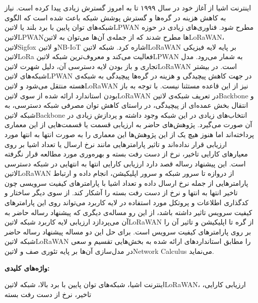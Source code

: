 \newpage\clearpage

\pagestyle{abstract}

\vspace*{-1cm}
\section*{\centering \abstractname}
\vspace*{.5cm}

اینترنت اشیا از آغاز خود در سال ۱۹۹۹ تا به امروز گسترش زیادی پیدا کرده است.
نیاز به کاهش هزینه در گره‌ها و گسترش پوشش شبکه باعث شده است که الگوی
شبکه‌های توان پایین با برد بلند یا
‌لاتین{LPWAN} مطرح شود.
فناوری‌های زیادی در حوزه ‌لاتین{LPWAN}ها مطرح شدند که از جمله‌ی آن‌ها می‌توان به ‌لاتین{LoRaWAN}، ‌لاتین{Sigfox} و ‌لاتین{NB-IoT}
اشاره کرد. شبکه ‌لاتین{LoRaWAN} بر پایه لایه فیزیکی ‌لاتین{LoRa} فعالیت می‌کند و
معروف‌ترین شبکه ‌لاتین{LPWAN} به شمار می‌رود. مدل تجاری و باز بودن
لایه دسترسی آن، دلیل شهرت ‌لاتین{LoRaWAN} است.
در بیشتر شبکه‌های ‌لاتین{LPWAN} در جهت کاهش پیچیدگی و هزینه در گره‌ها پیچیدگی به شبکه‌ی هسته منتقل می‌شود و ‌لاتین{LoRaWAN}
نیز از این قاعده مستثنا نیست.
با توجه به باز بودن استاندارد ارائه شده از سوی ‌لاتین{LoRaWAN} در تعریف شبکه‌ی ‌لاتین{Backbone} و
انتقال بخش عمده‌ای از پیچیدگی، در راستای کاهش توان مصرفی
شبکه دسترسی، به شبکه ‌لاتین{Backbone} انتخاب‌های زیادی در این شبکه وجود داشته و پردازش زیادی در آن صورت می‌گیرد.
پژوهش‌های حاضر به ارزیابی قسمت یا قسمت‌هایی از این معماری پرداخته‌اند اما هنوز هیچ یک از این پژوهش‌ها این معماری را به صورت
انتها به انتها مورد ارزیابی قرار نداده‌اند و تاثیر پارامترهایی مانند نرخ ارسال یا تعداد اشیا بر روی معیارهای کارایی تاخیر، نرخ از دست رفت بسته
و بهره‌وری مورد مطالعه قرار نگرفته است.
این پیشنهاد رساله قصد دارد ارزیابی کارایی انتها به انتهایی در شبکه دسترسی ‌لاتین{LoRaWAN}
از دروازه تا سرور شبکه و سرور اپلیکیشن،
انجام داده و ارتباط پارامترهایی از جمله نرخ ارسال داده و تعداد اشیا
با پارامترهای کیفیت سرویسی چون تاخیر انتها به انتها و نرخ از دست رفت بسته را آشکار کند.
از سوی دیگر ساختار و کدگذاری اطلاعات و پروتکل مورد استفاده در لایه کاربرد می‌تواند روی این پارامترهای کیفیت سرویس تاثیر داشته باشد،
از این رو مساله‌ی دیگری که پیشنهاد رساله حاضر به آن می‌پردازد
ارزیابی لایه کاربرد شبکه ‌لاتین{LoRaWAN} از گره تا اپلیکیشن
و تاثیر آن را بر روی پارامترهای کیفیت سرویس است.
برای حل این دو مساله پیشنهاد رساله حاضر شبکه ‌لاتین{LoRaWAN} را
مطابق استانداردهای ارائه شده
به بخش‌هایی تقسیم و سعی در مدل‌سازی آن‌ها بر پایه تئوری صف و ‌لاتین{Network Calculus}
می‌نماید.

\vspace*{2cm}

{%
  \noindent\large\textbf{واژه‌های کلیدی:}
}\par
\vspace*{.5cm}
اینترنت اشیا، شبکه‌های توان پایین با برد بالا، شبکه ‌لاتین{LoRaWAN}، ارزیابی کارایی، تاخیر، نرخ از دست رفت بسته
